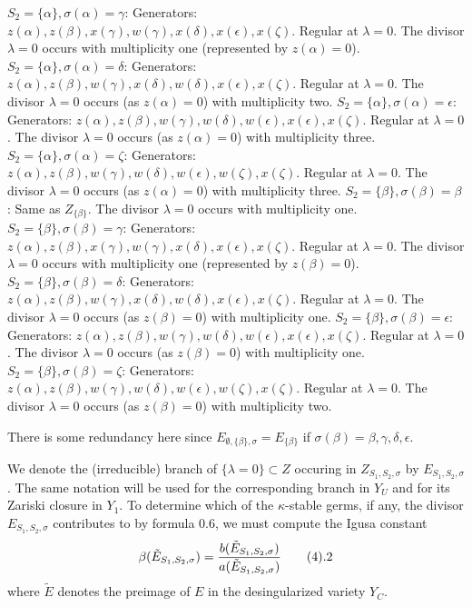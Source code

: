 $S_2=\{\alpha\}, \sigma(\alpha)=\gamma$: Generators: $z(\alpha), z(\beta),
x(\gamma), w(\gamma), x(\delta), x(\epsilon),
x(\zeta)$. Regular at $\lambda =0$. The divisor $\lambda =0$
occurs with multiplicity one (represented by $z(\alpha)=0$).
\newline
$S_2=\{\alpha\}, \sigma(\alpha)=\delta$: Generators: $z(\alpha), z(\beta),
w(\gamma), x(\delta),w(\delta), x(\epsilon),
x(\zeta)$. Regular at $\lambda =0$. The divisor $\lambda =0$
occurs (as $z(\alpha)=0$) with multiplicity two.
\newline
$S_2=\{\alpha\}, \sigma(\alpha)=\epsilon$: Generators: $z(\alpha), z(\beta),
w(\gamma), w(\delta),w(\epsilon),x(\epsilon),x(\zeta)$.
Regular at $\lambda =0$. The divisor $\lambda =0$
occurs (as $z(\alpha)=0$) with multiplicity three.
\newline
$S_2=\{\alpha\}, \sigma(\alpha)=\zeta$: Generators: $z(\alpha), z(\beta),
w(\gamma), w(\delta),w(\epsilon), w(\zeta),
x(\zeta)$. Regular at $\lambda =0$. The divisor $\lambda =0$
occurs (as $z(\alpha)=0$) with multiplicity three.
\newline
$S_2=\{\beta\}, \sigma(\beta)=\beta$: Same as $Z_{\{\beta\}}$.
The divisor $\lambda =0$
occurs with multiplicity one.
\newline
$S_2=\{\beta\}, \sigma(\beta)=\gamma$: Generators: $z(\alpha), z(\beta),
x(\gamma), w(\gamma), x(\delta), x(\epsilon),
x(\zeta)$. Regular at $\lambda =0$. The divisor $\lambda =0$
occurs with multiplicity one (represented by $z(\beta)=0$).
\newline
$S_2=\{\beta\}, \sigma(\beta)=\delta$: Generators: $z(\alpha), z(\beta),
w(\gamma), x(\delta),w(\delta), x(\epsilon),
x(\zeta)$. Regular at $\lambda =0$. The divisor $\lambda =0$
occurs (as $z(\beta)=0$) with multiplicity one.
\newline
$S_2=\{\beta\}, \sigma(\beta)=\epsilon$: Generators: $z(\alpha), z(\beta),
w(\gamma), w(\delta),w(\epsilon),x(\epsilon),x(\zeta)$.
Regular at $\lambda =0$. The divisor $\lambda =0$
occurs (as $z(\beta)=0$) with multiplicity one.
\newline
$S_2=\{\beta\}, \sigma(\beta)=\zeta$: Generators: $z(\alpha), z(\beta),
w(\gamma), w(\delta),w(\epsilon), w(\zeta),
x(\zeta)$. Regular at $\lambda =0$. The divisor $\lambda =0$
occurs (as $z(\beta)=0$) with multiplicity two.
\par
There is some redundancy here since $E_{\emptyset,\{\beta\},\sigma}=
E_{\{\beta\}}$ if $\sigma(\beta)=\beta,\gamma,\delta,\epsilon$.
\par
We denote the (irreducible) branch of $\{\lambda =0\}\subset Z$
occuring in $Z_{S_1,S_2,\sigma}$ by $E_{S_1,S_2,\sigma}$. The same notation
will be used for the corresponding branch in $Y_U$ and for its Zariski closure
in $Y_1$. To determine which of the $\kappa$-stable germs, if any,
the divisor $E_{S_1,S_2,\sigma}$
contributes to by formula 0.6,
we must compute the Igusa constant
$$
\beta(\tilde{E}_{S_1,S_2,\sigma})=
{b(\tilde{E}_{S_1,S_2,\sigma})\over a(\tilde{E}_{S_1,S_2,\sigma})}
\tag 4.2
$$
where $\tilde{E}$ denotes the preimage of $E$ in the
desingularized variety $Y_C$. 

